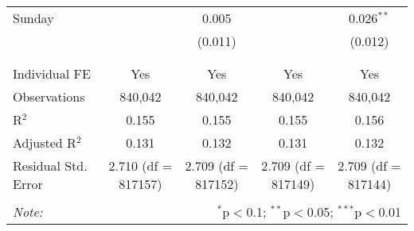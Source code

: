 \documentclass[
]{article}
\begin{document}
\begin{table}[!htbp]
{\begin{tabular}{@{\extracolsep{5pt}}lcccc}
 Sunday &  & 0.005 &  & 0.026$^{**}$ \\ 
  &  & (0.011) &  & (0.012) \\ 
  & & & & \\ 
\hline \\[-1.8ex] 
Individual FE & Yes & Yes & Yes & Yes \\ 
Observations & 840,042 & 840,042 & 840,042 & 840,042 \\ 
R$^{2}$ & 0.155 & 0.155 & 0.155 & 0.156 \\ 
Adjusted R$^{2}$ & 0.131 & 0.132 & 0.131 & 0.132 \\ 
Residual Std. Error & 2.710 (df = 817157) & 2.709 (df = 817152) & 2.709 (df = 817149) & 2.709 (df = 817144) \\ 
\hline 
\hline \\[-1.8ex] 
\textit{Note:}  & \multicolumn{4}{r}{$^{*}$p$<$0.1; $^{**}$p$<$0.05; $^{***}$p$<$0.01} \\ 
\end{tabular}
} 
\end{table}
\end{document}
